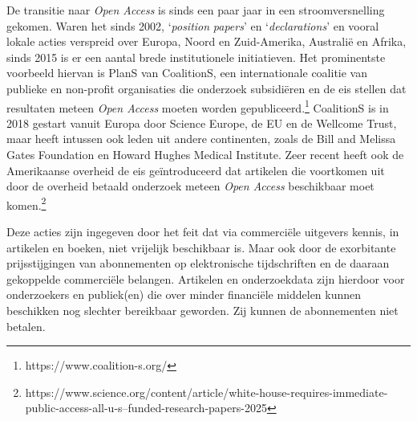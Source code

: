 \documentclass[smallauthor, chapterhaspagenum, nochapterinheader, pagenuminheader,  bigchapnum,medium2, tocpages, garamond, titleinheader]{jote-book}
\begin{document}
	De transitie naar \emph{Open Access} is sinds een paar jaar in een stroomversnelling gekomen. Waren het sinds 2002, ‘\emph{position}\emph{ papers}' en ‘\emph{d}\emph{eclarations}' en vooral lokale acties verspreid over Europa, Noord en Zuid-Amerika, Australië en Afrika, sinds 2015 is er een aantal brede institutionele initiatieven. Het prominentste voorbeeld hiervan is PlanS van CoalitionS, een internationale coalitie van publieke en non-profit organisaties die onderzoek subsidiëren en de eis stellen dat resultaten meteen \emph{Open Access} moeten worden gepubliceerd.\footnote{https://www.coalition-s.org/} CoalitionS is in 2018 gestart vanuit Europa door Science Europe, de EU en de Wellcome Trust, maar heeft intussen ook leden uit andere continenten, zoals de Bill and Melissa Gates Foundation en Howard Hughes Medical Institute. Zeer recent heeft ook de Amerikaanse overheid de eis geïntroduceerd dat artikelen die voortkomen uit door de overheid betaald onderzoek meteen \emph{Open Access} beschikbaar moet komen.\footnote{https://www.science.org/content/article/white-house-requires-immediate-public-access-all-u-s--funded-research-papers-2025}



	Deze acties zijn ingegeven door het feit dat via commerciële uitgevers kennis, in artikelen en boeken, niet vrijelijk beschikbaar is. Maar ook door de exorbitante prijsstijgingen van abonnementen op elektronische tijdschriften en de daaraan gekoppelde commerciële belangen. Artikelen en onderzoekdata zijn hierdoor voor onderzoekers en publiek(en) die over minder financiële middelen kunnen beschikken nog slechter bereikbaar geworden. Zij kunnen de abonnementen niet betalen.
\end{document}
